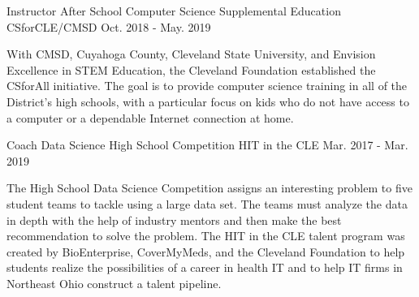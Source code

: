 
\begin{cventries}

  \cventry
    {Instructor} %
    {After School Computer Science Supplemental Education} %
    {CSforCLE/CMSD} %
    {Oct. 2018 - May. 2019} %
    {
      \begin{cvparagraph}
        With CMSD, Cuyahoga County, Cleveland State University, and Envision Excellence in STEM Education, the Cleveland Foundation established the CSforAll initiative. The goal is to provide computer science training in all of the District's high schools, with a particular focus on kids who do not have access to a computer or a dependable Internet connection at home.
      \end{cvparagraph}
    }

  \cventry
    {Coach} %
    {Data Science High School Competition} %
    {HIT in the CLE} %
    {Mar. 2017 - Mar. 2019} %
    {
      \begin{cvparagraph}
        The High School Data Science Competition assigns an interesting problem to five student teams to tackle using a large data set. The teams must analyze the data in depth with the help of industry mentors and then make the best recommendation to solve the problem. The HIT in the CLE talent program was created by BioEnterprise, CoverMyMeds, and the Cleveland Foundation to help students realize the possibilities of a career in health IT and to help IT firms in Northeast Ohio construct a talent pipeline.
      \end{cvparagraph}
    }


\end{cventries}
